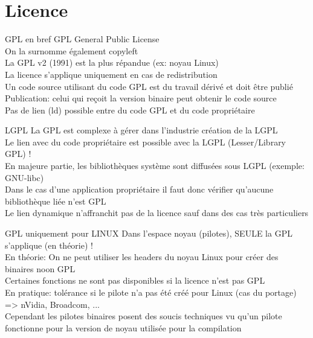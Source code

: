 \section{Licence}

\begin{frame}{GPL en bref}{}
	GPL General Public License \\
	On la surnomme également copyleft \\
	La GPL v2 (1991) est la plus répandue (ex: noyau Linux)\\
	La licence s'applique uniquement en cas de redistribution\\
	Un code source utilisant du code GPL est du travail dérivé et doit être publié\\
	Publication: celui qui reçoit la version binaire peut obtenir le code source\\
	Pas de lien (ld) possible entre du code GPL et du code propriétaire
\end{frame}

\begin{frame}{LGPL}{}
	La GPL est complexe à gérer dans l'industrie \MVRightarrow{} création de la LGPL \\
	Le lien avec du code propriétaire est possible avec la LGPL (Lesser/Library GPL) !\\
	En majeure partie, les bibliothèques système sont diffusées sous LGPL (exemple: GNU-libc)\\
	Dans le cas d'une application propriétaire il faut donc vérifier qu'aucune bibliothèque liée n'est GPL\\
	Le lien dynamique n'affranchit pas de la licence sauf dans des cas très particuliers\\
\end{frame}

\begin{frame}{GPL uniquement pour LINUX}{}
	Dans l'espace noyau (pilotes), SEULE la GPL s'applique (en théorie) !\\
	En théorie: On ne peut utiliser les headers du noyau Linux pour créer des binaires noon GPL\\
	Certaines fonctions ne sont pas disponibles si la licence n'est pas GPL\\
	En pratique: tolérance si le pilote n'a pas été créé pour Linux (cas du portage) => nVidia, Broadcom, ...\\
	Cependant les pilotes binaires posent des soucis techniques vu qu'un pilote fonctionne pour la version de noyau utilisée pour la compilation\\
\end{frame}


